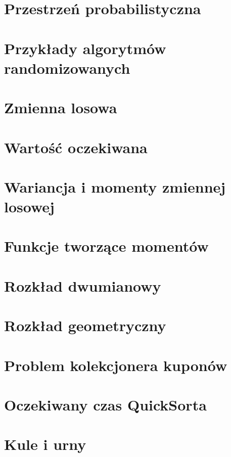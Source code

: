\section{Przestrzeń probabilistyczna}


\section{Przykłady algorytmów randomizowanych}


\section{Zmienna losowa}


\section{Wartość oczekiwana}


\section{Wariancja i momenty zmiennej losowej}


\section{Funkcje tworzące momentów}


\newpage
\section{Rozkład dwumianowy}


\newpage
\section{Rozkład geometryczny}


\newpage
\section{Problem kolekcjonera kuponów}
\label{coupon-collectors-problem}


\newpage
\section{Oczekiwany czas QuickSorta}


\newpage
\section{Kule i urny}
